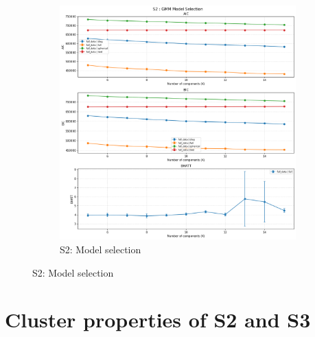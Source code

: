 \begin{appendices}
\begin{figure}[htbp]
  \begin{subfigure}[t]{\textwidth}
    \centering
    \includegraphics[width=\textwidth]{figures/appendix/S2_gmm_model_selection.png}
    \caption{S2: Model selection}
    \label{fig:s2_sel}
  \end{subfigure}

  \label{fig:two-rows}
\end{figure}

\section{Cluster properties of S2 and S3}


\begin{figure}[htbp]
  \centering


\end{figure}
\end{appendices}
